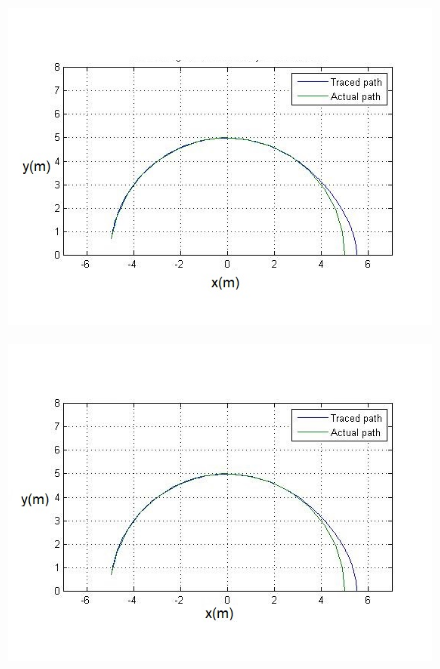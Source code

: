  \begin{figure}[h]
 	 \begin{minipage}[T]{0.5\linewidth}
 	 	\centering
 	 	\captionsetup{justification=centering}
 		\includegraphics[width=\linewidth,keepaspectratio]{Chapter7/fig/withPrediction05dely}
 		\label{fig:PreDelay500plot}
 	\end{minipage}
 \hfill
 	\begin{minipage}[T]{0.5\linewidth}
 		\centering
 		\captionsetup{justification=centering}
		\includegraphics[width=\linewidth,keepaspectratio]{Chapter7/fig/withPrediction08delay}
		\label{fig:PreDelay800plot} 
 	\end{minipage}
 \end{figure} 


